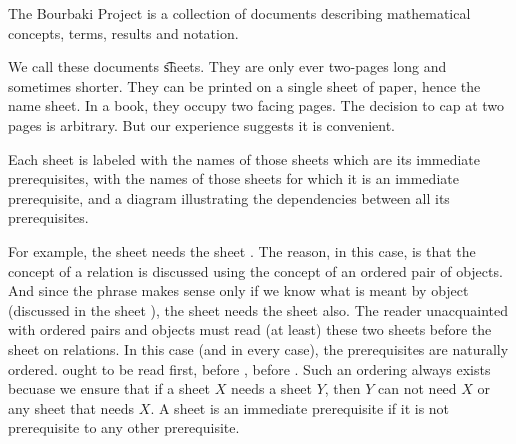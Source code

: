
The Bourbaki Project is a collection of documents describing mathematical concepts, terms, results and notation.


We call these documents \t{sheets}.
They are only ever two-pages long and sometimes shorter.
They can be printed on a single sheet of paper, hence the name sheet.
In a book, they occupy two facing pages.
The decision to cap at two pages is arbitrary.
But our experience suggests it is convenient.



Each sheet is labeled with the names of those sheets which are its immediate prerequisites, with the names of those sheets for which it is an immediate prerequisite, and a diagram illustrating the dependencies between all its prerequisites.

For example, the sheet  needs the sheet .
The reason, in this case, is that the concept of a relation is discussed using the concept of an ordered pair of objects.
And since the phrase  makes sense only if we know what is meant by object (discussed in the sheet ), the sheet  needs the sheet  also.
The reader unacquainted with ordered pairs and objects must read (at least) these two sheets before the sheet on relations.
In this case (and in every case), the prerequisites are naturally ordered.
 ought to be read first, before , before .
Such an ordering always exists becuase we ensure that if a sheet $X$ needs a sheet $Y$, then $Y$ can not need $X$ or any sheet that needs $X$.
A sheet is an immediate prerequisite if it is not prerequisite to any other prerequisite.

